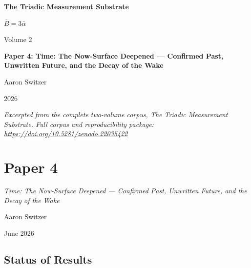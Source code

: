 \documentclass[11pt,oneside]{report}
\theoremstyle{definition}
\theoremstyle{remark}
\begin{document}
\thispagestyle{empty}
\begin{titlepage}
\centering
\vspace*{2cm}
{\sffamily\bfseries\Large The Triadic Measurement Substrate\par}
\vspace{0.6cm}
{\large $\bar{B} = 3\bar{\alpha}$\par}
\vspace{1cm}
{\sffamily\large Volume 2\par}
\vspace{1.4cm}
{\Large \bfseries Paper 4: Time: The Now-Surface Deepened --- Confirmed Past, Unwritten Future, and the Decay of the Wake\par}
\vfill
{\large Aaron Switzer\par}
\vspace{0.4cm}
{\large 2026\par}
\vspace{1.2cm}
{\small\itshape Excerpted from the complete two-volume corpus, \emph{The Triadic Measurement Substrate}. Full corpus and reproducibility package: \url{https://doi.org/10.5281/zenodo.22035422}\par}
\end{titlepage}
\cleardoublepage
{}

\chapter*{Paper 4}
\begingroup\centering
{\large\itshape Time: The Now-Surface Deepened --- Confirmed Past, Unwritten Future, and the Decay of the Wake\par}\vspace{0.8em}
{\normalsize Aaron Switzer\par}
{\small June 2026\par}
\endgroup\vspace{1.0em}

\par\vspace{0.6em}

\section*{Status of Results}
\end{document}
